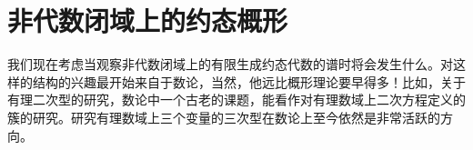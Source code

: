 \section{非代数闭域上的约态概形}

我们现在考虑当观察非代数闭域上的有限生成约态代数的谱时将会发生什么。对这样的结构的兴趣最开始来自于数论，当然，他远比概形理论要早得多！比如，关于有理二次型的研究，数论中一个古老的课题，能看作对有理数域上二次方程定义的簇的研究。研究有理数域上三个变量的三次型在数论上至今依然是非常活跃的方向。